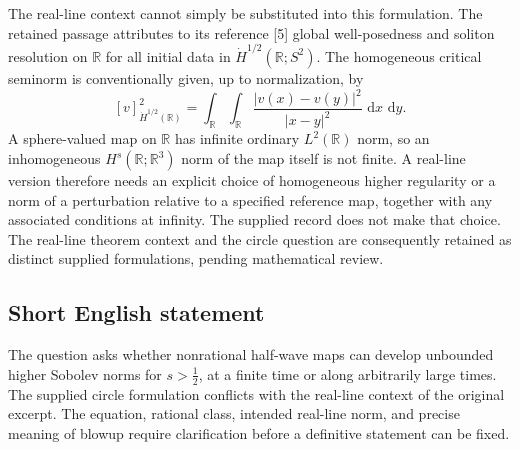 \documentclass[11pt]{article}
\newcommand{\R}{\mathbb{R}}
\newcommand{\dd}{\,\mathrm{d}}
\begin{document}
The real-line context cannot simply be substituted into this formulation. The retained passage attributes to its reference [5] global well-posedness and soliton resolution on \(\R\) for all initial data in \(\dot H^{1/2}(\R;S^2)\). The homogeneous critical seminorm is conventionally given, up to normalization, by
\[
[v]_{\dot H^{1/2}(\R)}^2=\int_{\R}\int_{\R}\frac{|v(x)-v(y)|^2}{|x-y|^2}\,\dd x\,\dd y.
\]
A sphere-valued map on \(\R\) has infinite ordinary \(L^2(\R)\) norm, so an inhomogeneous \(H^s(\R;\R^3)\) norm of the map itself is not finite. A real-line version therefore needs an explicit choice of homogeneous higher regularity or a norm of a perturbation relative to a specified reference map, together with any associated conditions at infinity. The supplied record does not make that choice. The real-line theorem context and the circle question are consequently retained as distinct supplied formulations, pending mathematical review.
\subsection{Short English statement}
The question asks whether nonrational half-wave maps can develop unbounded higher Sobolev norms for \(s>\tfrac12\), at a finite time or along arbitrarily large times. The supplied circle formulation conflicts with the real-line context of the original excerpt. The equation, rational class, intended real-line norm, and precise meaning of blowup require clarification before a definitive statement can be fixed.
\end{document}
